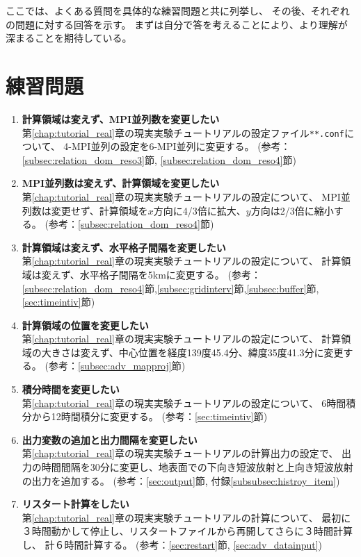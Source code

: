 ここでは、よくある質問を具体的な練習問題と共に列挙し、
その後、それぞれの問題に対する回答を示す。
まずは自分で答を考えることにより、より理解が深まることを期待している。


\section*{練習問題}

\begin{enumerate}
\item {\bf 計算領域は変えず、MPI並列数を変更したい}\\
第\ref{chap:tutorial_real}章の現実実験チュートリアルの設定ファイル\verb|**.conf|について、
4-MPI並列の設定を6-MPI並列に変更する。
(参考：\ref{subsec:relation_dom_reso3}節, \ref{subsec:relation_dom_reso4}節)

\item {\bf MPI並列数は変えず、計算領域を変更したい}\\
第\ref{chap:tutorial_real}章の現実実験チュートリアルの設定について、
MPI並列数は変更せず、計算領域を$x$方向に4/3倍に拡大、$y$方向は2/3倍に縮小する。
(参考：\ref{subsec:relation_dom_reso4}節)

\item {\bf 計算領域は変えず、水平格子間隔を変更したい}\\
第\ref{chap:tutorial_real}章の現実実験チュートリアルの設定について、
計算領域は変えず、水平格子間隔を5kmに変更する。
(参考：\ref{subsec:relation_dom_reso4}節,\ref{subsec:gridinterv}節,\ref{subsec:buffer}節, \ref{sec:timeintiv}節)

\item {\bf 計算領域の位置を変更したい}\\
第\ref{chap:tutorial_real}章の現実実験チュートリアルの設定について、
計算領域の大きさは変えず、中心位置を経度139度45.4分、緯度35度41.3分に変更する。
(参考：\ref{subsec:adv_mapproj}節)

\item {\bf 積分時間を変更したい}\\
第\ref{chap:tutorial_real}章の現実実験チュートリアルの設定について、
6時間積分から12時間積分に変更する。
(参考：\ref{sec:timeintiv}節)

\item {\bf 出力変数の追加と出力間隔を変更したい}\\
第\ref{chap:tutorial_real}章の現実実験チュートリアルの計算出力の設定で、
出力の時間間隔を30分に変更し、地表面での下向き短波放射と上向き短波放射の出力を追加する。
(参考：\ref{sec:output}節, 付録\ref{subsubsec:histroy_item})

\item {\bf リスタート計算をしたい}\\
第\ref{chap:tutorial_real}章の現実実験チュートリアルの計算について、
最初に３時間動かして停止し、リスタートファイルから再開してさらに３時間計算し、
計６時間計算する。
(参考：\ref{sec:restart}節, \ref{sec:adv_datainput})


\end{enumerate}

